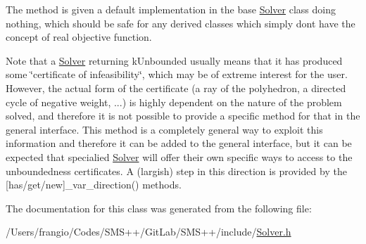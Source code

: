 The method is given a default implementation in the base \mbox{\hyperlink{class_s_m_spp__di__unipi__it_1_1_solver}{Solver}} class doing nothing, which should be safe for any derived classes which simply don\textquotesingle{}t have the concept of real objective function.

Note that a \mbox{\hyperlink{class_s_m_spp__di__unipi__it_1_1_solver}{Solver}} returning k\+Unbounded usually means that it has produced some \char`\"{}certificate of infeasibility\char`\"{}, which may be of extreme interest for the user. However, the actual form of the certificate (a ray of the polyhedron, a directed cycle of negative weight, ...) is highly dependent on the nature of the problem solved, and therefore it is not possible to provide a specific method for that in the general interface. This method is a completely general way to exploit this information and therefore it can be added to the general interface, but it can be expected that specialied \mbox{\hyperlink{class_s_m_spp__di__unipi__it_1_1_solver}{Solver}} will offer their own specific ways to access to the unboundedness certificates. A (largish) step in this direction is provided by the \mbox{[}has/get/new\mbox{]}\+\_\+var\+\_\+direction() methods. 

The documentation for this class was generated from the following file\+:\begin{DoxyCompactItemize}
\item 
/\+Users/frangio/\+Codes/\+S\+M\+S++/\+Git\+Lab/\+S\+M\+S++/include/\mbox{\hyperlink{_solver_8h}{Solver.\+h}}\end{DoxyCompactItemize}
